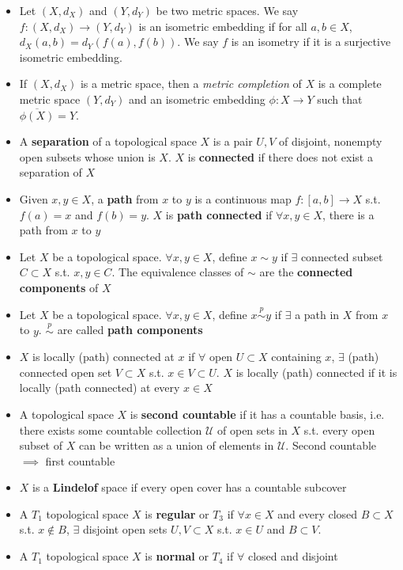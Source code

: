 \documentclass[frenchspacing,9pt,landscape,a4paper]{article}
\theoremstyle{remark}
\begin{document}
\begin{multicols}{4}
\begin{itemize}
\item Let $(X,d_X)$ and $(Y,d_Y)$ be two metric spaces. We say $f:(X,d_X) \to (Y,d_Y)$ is an isometric embedding if for all $a,b \in X$, $d_X(a,b) = d_Y(f(a),f(b))$. We say $f$ is an isometry if it is a surjective isometric embedding. 
\item If $(X,d_X)$ is a metric space, then a \textit{metric completion} of $X$ is a complete metric space $(Y,d_Y)$ and an isometric embedding $\phi: X \to Y$ such that $\overline{\phi(X)} = Y$.
\item A \textbf{separation} of a topological space $X$ is a pair  $U,V$ of disjoint, nonempty open subsets
    whose union is  $X$.  $X$ is \textbf{connected} if there does not exist a separation of  $X$
\item Given $x,y\in X$, a \textbf{path} from  $x$ to  $y$ is a continuous map  $f:[a,b]\to X$ s.t.
    $f(a)=x$ and  $f(b)=y$.  $X$ is \textbf{path connected} if  $\forall x,y\in X$, there is a path from
    $x$ to  $y$    
\item Let $X$ be a topological space.  $\forall x,y\in X$, define  $x\sim y$ if  $\exists$ connected subset
    $C\subset X$ s.t.  $x,y\in C$. The equivalence classes of  $\sim$ are the \textbf{connected components}
    of  $X$
\item Let $X$ be a topological space.  $\forall x,y\in X$, define  $x\overset{p}\sim y$ if $\exists$ a path
    in $X$ from  $x$ to  $y$.  $\overset{p}\sim$ are called \textbf{path components}
\item $X$ is locally (path) connected at  $x$ if  $\forall$ open  $U\subset X$ containing  $x$,  $\exists$
    (path) connected open set $V\subset X$ s.t.  $x\in V\subset U$. $X$ is locally (path) connected if it
    is locally (path connected) at every  $x\in X$   
\item A topological space $X$ is \textbf{second countable} if it has a countable basis, i.e. there exists
    some countable collection  $\mathcal{U}$ of open sets in  $X$ s.t. every open subset of  $X$ can be
    written as a union of elements in  $\mathcal{U}$. Second countable $\implies$ first countable 
\item $X$ is a \textbf{Lindelof} space if every open cover has a countable subcover
\item A $T_1$ topological space $X$ is \textbf{regular} or  $T_3$ if $\forall x\in X$ and every closed
    $B\subset X$ s.t.  $x\notin B$,  $\exists$ disjoint open sets  $U,V\subset X$ s.t.  $x\in U$ and
    $B\subset V$.
\item A $T_1$ topological space $X$ is \textbf{normal} or  $T_4$ if $\forall$ closed and disjoint

\end{itemize}
\end{multicols}
\end{document}
